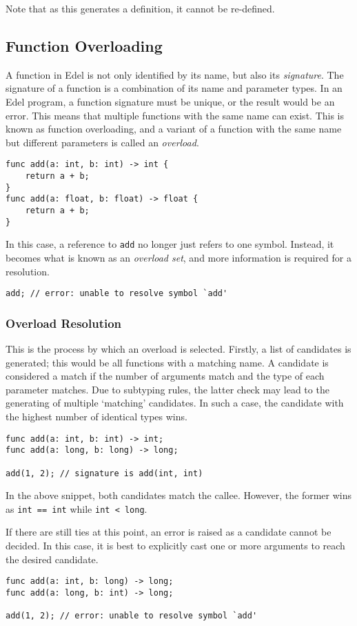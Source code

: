 Note that as this generates a definition, it cannot be re-defined.

\subsection{Function Overloading}\label{subsec:function-overloading}

A function in Edel is not only identified by its name, but also its \textit{signature}.
The signature of a function is a combination of its name and parameter types.
In an Edel program, a function signature must be unique, or the result would be an error.
This means that multiple functions with the same name can exist.
This is known as function overloading, and a variant of a function with the same name but different parameters is called an \textit{overload}.

\begin{lstlisting}[language=CustomLang]
func add(a: int, b: int) -> int {
    return a + b;
}
func add(a: float, b: float) -> float {
    return a + b;
}
\end{lstlisting}

In this case, a reference to \texttt{add} no longer just refers to one symbol.
Instead, it becomes what is known as an \textit{overload set}, and more information is required for a resolution.

\begin{lstlisting}[language=CustomLang]
add; // error: unable to resolve symbol `add'
\end{lstlisting}

\subsubsection{Overload Resolution}

This is the process by which an overload is selected.
Firstly, a list of candidates is generated; this would be all functions with a matching name.
A candidate is considered a match if the number of arguments match and the type of each parameter matches.
Due to subtyping rules, the latter check may lead to the generating of multiple `matching' candidates.
In such a case, the candidate with the highest number of identical types wins.

\begin{lstlisting}[language=CustomLang]
func add(a: int, b: int) -> int;
func add(a: long, b: long) -> long;

add(1, 2); // signature is add(int, int)
\end{lstlisting}

In the above snippet, both candidates match the callee.
However, the former wins as \texttt{int == int} while \texttt{int < long}.

If there are still ties at this point, an error is raised as a candidate cannot be decided.
In this case, it is best to explicitly cast one or more arguments to reach the desired candidate.

\begin{lstlisting}[language=CustomLang]
func add(a: int, b: long) -> long;
func add(a: long, b: int) -> long;

add(1, 2); // error: unable to resolve symbol `add'
\end{lstlisting}
